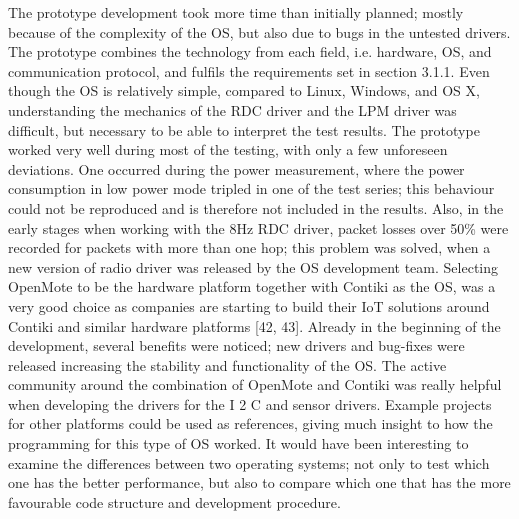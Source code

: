 The prototype development took more time than initially planned;
	mostly because of the complexity of the OS,
	but also due to bugs in the untested drivers.
The prototype combines the technology from each field,
	i.e.
hardware,
	OS,
	and communication protocol,
	and fulfils the requirements set in section 3.1.1.
Even though the OS is relatively simple,
	compared to Linux,
	Windows,
	and OS X,
	understanding the mechanics of the RDC driver and the LPM driver was difficult,
	but necessary to be able to interpret the test results.
The prototype worked very well during most of the testing,
	with only a few unforeseen deviations.
One occurred during the power measurement,
	where the power consumption in low power mode tripled in one of the test series;
	this behaviour could not be reproduced and is therefore not included in the results.
Also,
	in the early stages when working with the 8Hz RDC driver,
	packet losses over 50\% were recorded for packets with more
than one hop;
	this problem was solved,
	when a new version of radio driver was released by the OS development team.
Selecting OpenMote to be the hardware platform together with Contiki as the OS,
	was a very good choice as companies are starting to build their IoT solutions around Contiki and similar hardware platforms [42, 43].
Already in the beginning of the development,
	several benefits were noticed;
	new drivers and bug-fixes were released increasing the stability and functionality of the OS.
The active community around the combination of OpenMote and Contiki was really helpful when developing the drivers for the I 2 C and sensor drivers.
Example projects for other platforms could be used as references,
	giving much insight to how the programming for this type of OS worked.
It would have been interesting to examine the differences between two operating systems;
	not only to test which one has the better performance,
	but also to compare which one that has the more favourable code structure and development procedure.







